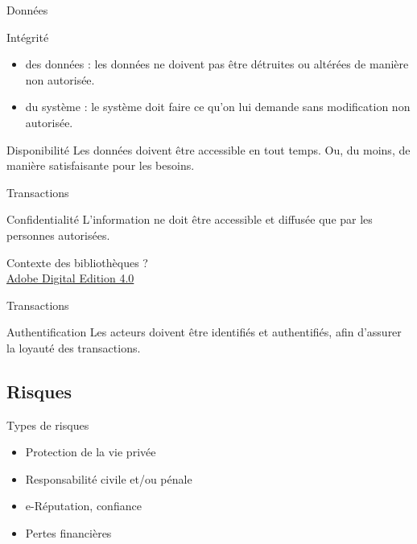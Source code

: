 \documentclass[12pt]{beamer}
\begin{document}
		\begin{frame}{Données}

			\begin{exampleblock}{Intégrité}
				\begin{itemize}
					\item des données : les données ne doivent pas être détruites ou altérées de manière non autorisée.
					\item du système : le système doit faire ce qu'on lui demande sans modification non autorisée.
				\end{itemize}
			\end{exampleblock}
			\begin{exampleblock}{Disponibilité}
				Les données doivent être accessible en tout temps. Ou, du moins, de manière satisfaisante pour les besoins.
			\end{exampleblock}
		\end{frame}
		
		\begin{frame}{Transactions}
			\onslide<1->\begin{exampleblock}{Confidentialité}
				L'information ne doit être accessible et diffusée que par les personnes autorisées.
			\end{exampleblock}
			Contexte des bibliothèques ? \\
			\onslide<3>\href{https://id-libre.org/shaarli/?aUbIGw}{{\color{blue}Adobe Digital Edition 4.0}}
		\end{frame}
		\begin{frame}{Transactions}
			\begin{exampleblock}{Authentification}
				Les acteurs doivent être identifiés et authentifiés, afin d'assurer la loyauté des transactions.
			\end{exampleblock}
		\end{frame}
	
	\subsection{Risques}
	
		\begin{frame}{Types de risques}
			\begin{itemize}
				\item Protection de la vie privée
				\item Responsabilité civile et/ou pénale
				\item e-Réputation, confiance
				\item Pertes financières
			\end{itemize}
		\end{frame}
\end{document}
